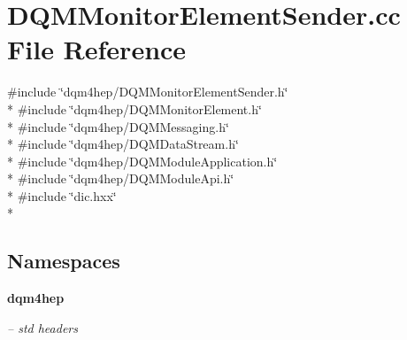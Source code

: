\section{D\+Q\+M\+Monitor\+Element\+Sender.\+cc File Reference}
\label{DQMMonitorElementSender_8cc}
{\ttfamily \#include \char`\"{}dqm4hep/\+D\+Q\+M\+Monitor\+Element\+Sender.\+h\char`\"{}}\\*
{\ttfamily \#include \char`\"{}dqm4hep/\+D\+Q\+M\+Monitor\+Element.\+h\char`\"{}}\\*
{\ttfamily \#include \char`\"{}dqm4hep/\+D\+Q\+M\+Messaging.\+h\char`\"{}}\\*
{\ttfamily \#include \char`\"{}dqm4hep/\+D\+Q\+M\+Data\+Stream.\+h\char`\"{}}\\*
{\ttfamily \#include \char`\"{}dqm4hep/\+D\+Q\+M\+Module\+Application.\+h\char`\"{}}\\*
{\ttfamily \#include \char`\"{}dqm4hep/\+D\+Q\+M\+Module\+Api.\+h\char`\"{}}\\*
{\ttfamily \#include \char`\"{}dic.\+hxx\char`\"{}}\\*
\subsection*{Namespaces}
\begin{DoxyCompactItemize}
\item 
 {\bf dqm4hep}
\begin{DoxyCompactList}\small\item\em -- std headers \end{DoxyCompactList}\end{DoxyCompactItemize}
